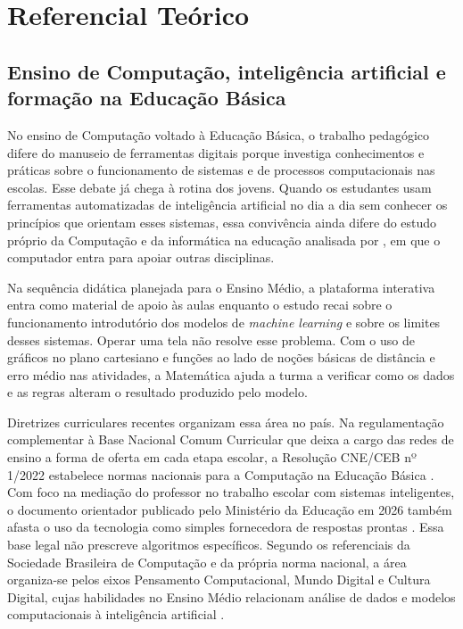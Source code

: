 \chapter{Referencial Teórico}

\section{Ensino de Computação, inteligência artificial e formação na Educação Básica}

No ensino de Computação voltado à Educação Básica, o trabalho pedagógico difere do manuseio de ferramentas digitais porque investiga conhecimentos e práticas sobre o funcionamento de sistemas e de processos computacionais nas escolas. Esse debate já chega à rotina dos jovens. Quando os estudantes usam ferramentas automatizadas de inteligência artificial no dia a dia sem conhecer os princípios que orientam esses sistemas, essa convivência ainda difere do estudo próprio da Computação e da informática na educação analisada por , em que o computador entra para apoiar outras disciplinas.

Na sequência didática planejada para o Ensino Médio, a plataforma interativa entra como material de apoio às aulas enquanto o estudo recai sobre o funcionamento introdutório dos modelos de \textit{machine learning} e sobre os limites desses sistemas. Operar uma tela não resolve esse problema. Com o uso de gráficos no plano cartesiano e funções ao lado de noções básicas de distância e erro médio nas atividades, a Matemática ajuda a turma a verificar como os dados e as regras alteram o resultado produzido pelo modelo.

Diretrizes curriculares recentes organizam essa área no país. Na regulamentação complementar à Base Nacional Comum Curricular que deixa a cargo das redes de ensino a forma de oferta em cada etapa escolar, a Resolução CNE/CEB nº 1/2022 estabelece normas nacionais para a Computação na Educação Básica \cite{brasil2022computacao}. Com foco na mediação do professor no trabalho escolar com sistemas inteligentes, o documento orientador publicado pelo Ministério da Educação em 2026 também afasta o uso da tecnologia como simples fornecedora de respostas prontas \cite{brasil2026iaeducacaobasica}. Essa base legal não prescreve algoritmos específicos. Segundo os referenciais da Sociedade Brasileira de Computação e da própria norma nacional, a área organiza-se pelos eixos Pensamento Computacional, Mundo Digital e Cultura Digital, cujas habilidades no Ensino Médio relacionam análise de dados e modelos computacionais à inteligência artificial \cite{sbc2018diretrizes,brasil2022computacao}.

